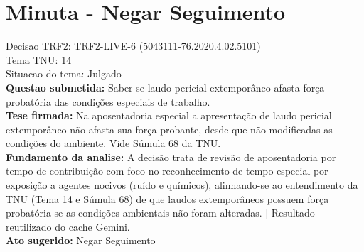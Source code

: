 \documentclass{article}
\begin{document}
\section*{Minuta - Negar Seguimento}
Decisao TRF2: TRF2-LIVE-6 (5043111-76.2020.4.02.5101)\\
Tema TNU: 14\\
Situacao do tema: Julgado\\
\textbf{Questao submetida:} Saber se laudo pericial extemporâneo afasta força probatória das condições especiais de trabalho.\\
\textbf{Tese firmada:} Na aposentadoria especial a apresentação de laudo pericial extemporâneo não afasta sua força probante, desde que não modificadas as condições do ambiente. Vide Súmula 68 da TNU.\\
\textbf{Fundamento da analise:} A decisão trata de revisão de aposentadoria por tempo de contribuição com foco no reconhecimento de tempo especial por exposição a agentes nocivos (ruído e químicos), alinhando-se ao entendimento da TNU (Tema 14 e Súmula 68) de que laudos extemporâneos possuem força probatória se as condições ambientais não foram alteradas. | Resultado reutilizado do cache Gemini.\\
\textbf{Ato sugerido:} Negar Seguimento
\end{document}
